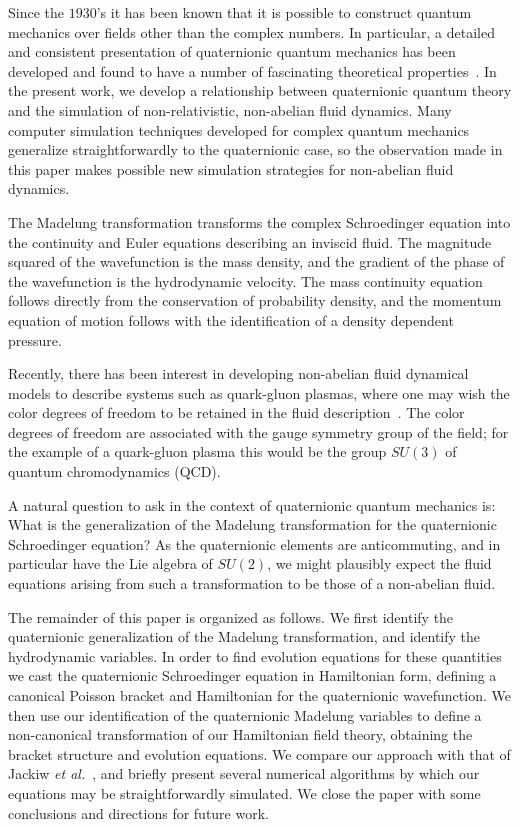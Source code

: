 \documentclass[a4paper,aps,prd,preprint,groupedaddress]{revtex4}
\begin{document}
Since the $1930$'s it has been known that it is possible to construct quantum mechanics over fields other than the complex numbers. In particular, a detailed and consistent presentation of quaternionic quantum mechanics has been developed and found to have a number of fascinating theoretical properties~\cite{bib:adlerbook}. In the present work, we develop a relationship between quaternionic quantum theory and the simulation of non-relativistic, non-abelian fluid dynamics. Many computer simulation techniques developed for complex quantum mechanics generalize straightforwardly to the quaternionic case, so the observation made in this paper makes possible new simulation strategies for non-abelian fluid dynamics.

The Madelung transformation transforms the complex Schroedinger equation into the continuity and Euler equations describing an inviscid fluid. The magnitude squared of the wavefunction is the mass density, and the gradient of the phase of the wavefunction is the hydrodynamic velocity. The mass continuity equation follows directly from the conservation of probability density, and the momentum equation of motion follows with the identification of a density dependent pressure.

Recently, there has been interest in developing non-abelian fluid dynamical models to describe systems such as quark-gluon plasmas, where one may wish the color degrees of freedom to be retained in the fluid description~\cite{bib:jackiw1,bib:jackiw2,bib:jackiw3}. The color degrees of freedom are associated with the gauge symmetry group of the field; for the example of a quark-gluon plasma this would be the group $SU(3)$ of quantum chromodynamics (QCD). 

A natural question to ask in the context of quaternionic quantum mechanics is: What is the generalization of the Madelung transformation for the quaternionic Schroedinger equation?  As the quaternionic elements are anticommuting, and in particular have the Lie algebra of $SU(2)$, we might plausibly expect the fluid equations arising from such a transformation to be those of a non-abelian fluid.

The remainder of this paper is organized as follows. We first identify the quaternionic generalization of the Madelung transformation, and identify the hydrodynamic variables.  In order to find evolution equations for these quantities we cast the quaternionic Schroedinger equation in Hamiltonian form, defining a canonical Poisson bracket and Hamiltonian for the quaternionic wavefunction. We then use our identification of the quaternionic Madelung  variables to define a non-canonical transformation of our Hamiltonian field theory, obtaining the bracket structure and evolution equations. We compare our approach with that of Jackiw {\it et al.}~\cite{bib:jackiw1,bib:jackiw2, bib:jackiw3}, and briefly present several numerical algorithms by which our equations may be straightforwardly simulated. We close the paper with some conclusions and directions for future work.
\end{document}
